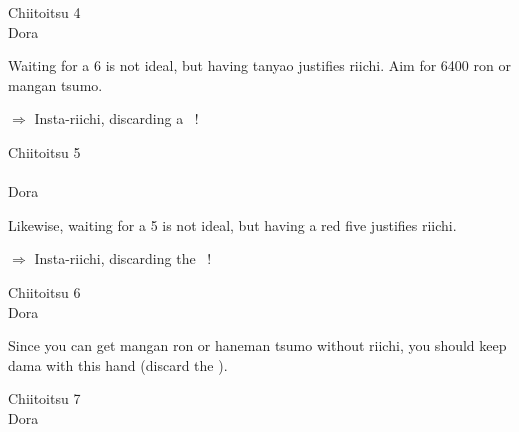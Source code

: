 \bigskip
\begin{itembox}[r]{{\jap Chiitoitsu 4}}
\bp
{}~~\bei\\
\hspace{310pt}\footnotesize{\jap Dora}
\ep
\vspace{-15pt}
\end{itembox}

\noindent Waiting for a 6 is not ideal, but having {\jap tanyao} justifies {\jap riichi}. Aim for 6400 {\jap ron} or {\jap mangan} {\jap tsumo}.

\begin{center}
{\large $\Rightarrow$ Insta-{\jap riichi}, discarding a ~!}
\end{center}

\bigskip
\begin{itembox}[r]{{\jap Chiitoitsu 5}}
\bp
{}\\ \vspace{-18pt}
\rfd{}\zhong\zhong\fa\fa~~\bei\\
\hspace{310pt}\footnotesize{\jap Dora}
\ep
\vspace{-15pt}
\end{itembox}

\noindent Likewise, waiting for a 5 is not ideal, but having a red five justifies {\jap riichi}. 

\begin{center}
{\large $\Rightarrow$ Insta-{\jap riichi}, discarding the ~!}
\end{center}

\bigskip
\begin{itembox}[r]{{\jap Chiitoitsu 6}}
\bp
{}\fa\fa\bai\bai~~\bei\\
\hspace{310pt}\footnotesize{\jap Dora}
\ep
\vspace{-15pt}
\end{itembox}

\noindent Since you can get {\jap mangan ron} or {\jap haneman tsumo} without {\jap riichi}, you should keep {\jap dama} with this hand (discard the {\large {}}). 

\bigskip
\begin{itembox}[r]{{\jap Chiitoitsu 7}}
\bp
{}\fa\fa~~\bei\\
\hspace{310pt}\footnotesize{\jap Dora}
\ep
\vspace{-15pt}
\end{itembox}


